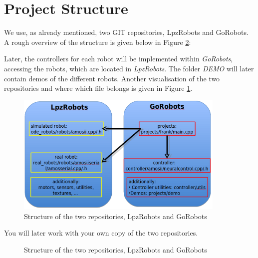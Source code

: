 \section{Project Structure}

We use, as already mentioned, two GIT repositories, LpzRobots and GoRobots. A rough overview of the structure is given below in Figure \ref{struc}:


Later, the controllers for each robot will be implemented within \emph{GoRobots}, accessing the robots, which are located in \emph{LpzRobots}. The folder \emph{DEMO} will later contain demos of the different robots.
Another visualisation of the two repositories and where which file belongs is given in Figure \ref{struc2}. 
\begin{figure}[h!]
 \begin{center}
  \includegraphics[width=10cm]{./pics/struct.png}
 \end{center}
\caption{Structure of the two repositories, LpzRobots and GoRobots}
\label{struc2}
\end{figure}

You will later work with your own copy of the two repositories.

\newpage

\begin{figure}[h!]
 \begin{center}
  
 \end{center}
\caption{Structure of the two repositories, LpzRobots and GoRobots}
\label{struc}
\end{figure}